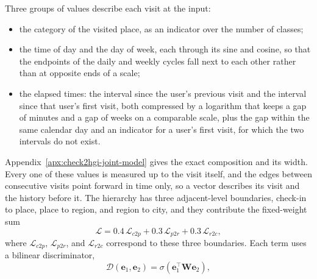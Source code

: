 Three groups of values describe each visit at the input:
\begin{itemize}
    \item the category of the visited place, as an indicator over the number of classes;
    \item the time of day and the day of week, each through its sine and cosine, so that
    the endpoints of the daily and weekly cycles fall next to each other rather than at
    opposite ends of a scale;
    \item the elapsed times: the interval since the user's previous visit and the interval
    since that user's first visit, both compressed by a logarithm that keeps a gap of
    minutes and a gap of weeks on a comparable scale, plus the gap within the same
    calendar day and an indicator for a user's first visit, for which the two intervals
    do not exist.
\end{itemize}
Appendix~\ref{apx:check2hgi-joint-model} gives the exact composition and its width. Every
one of these values is measured up to the visit itself, and the edges between consecutive
visits point forward in time only, so a vector describes its visit and the history before
it. The hierarchy has three adjacent-level boundaries, check-in to place, place to region,
and region to city, and they contribute the fixed-weight sum
\begin{equation}\label{eq:fund:check2hgi}
    \mathcal{L} = 0.4\,\mathcal{L}_{c2p} + 0.3\,\mathcal{L}_{p2r} + 0.3\,\mathcal{L}_{r2c},
\end{equation}
where $\mathcal{L}_{c2p}$, $\mathcal{L}_{p2r}$, and $\mathcal{L}_{r2c}$ correspond
to these three boundaries. Each term uses a bilinear discriminator,
\begin{equation}\label{eq:fund:check2hgi-disc}
    \mathcal{D}(\mathbf{e}_1, \mathbf{e}_2) = \sigma(\mathbf{e}_1^{\top}\mathbf{W}\mathbf{e}_2),
\end{equation}
